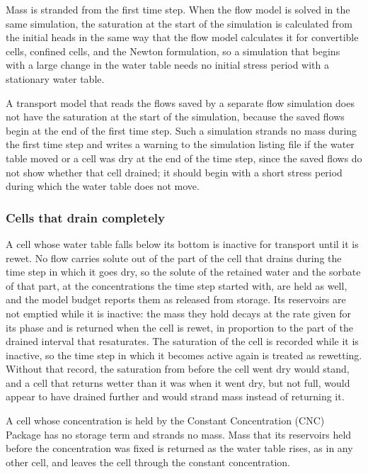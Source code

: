 Mass is stranded from the first time step. When the flow model is solved in the same simulation, the saturation at the start of the simulation is calculated from the initial heads in the same way that the flow model calculates it for convertible cells, confined cells, and the Newton formulation, so a simulation that begins with a large change in the water table needs no initial stress period with a stationary water table.

A transport model that reads the flows saved by a separate flow simulation does not have the saturation at the start of the simulation, because the saved flows begin at the end of the first time step. Such a simulation strands no mass during the first time step and writes a warning to the simulation listing file if the water table moved or a cell was dry at the end of the time step, since the saved flows do not show whether that cell drained; it should begin with a short stress period during which the water table does not move.

\subsubsection{Cells that drain completely}

A cell whose water table falls below its bottom is inactive for transport until it is rewet. No flow carries solute out of the part of the cell that drains during the time step in which it goes dry, so the solute of the retained water and the sorbate of that part, at the concentrations the time step started with, are held as well, and the model budget reports them as released from storage. Its reservoirs are not emptied while it is inactive: the mass they hold decays at the rate given for its phase and is returned when the cell is rewet, in proportion to the part of the drained interval that resaturates. The saturation of the cell is recorded while it is inactive, so the time step in which it becomes active again is treated as rewetting. Without that record, the saturation from before the cell went dry would stand, and a cell that returns wetter than it was when it went dry, but not full, would appear to have drained further and would strand mass instead of returning it.

A cell whose concentration is held by the Constant Concentration (CNC) Package has no storage term and strands no mass. Mass that its reservoirs held before the concentration was fixed is returned as the water table rises, as in any other cell, and leaves the cell through the constant concentration.

